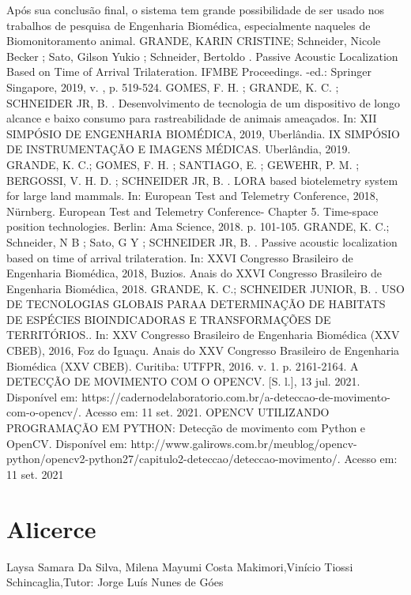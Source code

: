 Após sua conclusão final, o sistema tem grande possibilidade de ser usado nos trabalhos de
pesquisa de Engenharia Biomédica, especialmente naqueles de Biomonitoramento animal.
GRANDE, KARIN CRISTINE; Schneider, Nicole Becker ; Sato, Gilson Yukio ; Schneider, Bertoldo . Passive Acoustic Localization
Based on Time of Arrival Trilateration. IFMBE Proceedings. -ed.: Springer Singapore, 2019, v. , p. 519-524.
GOMES, F. H. ; GRANDE, K. C. ; SCHNEIDER JR, B. . Desenvolvimento de tecnologia de um dispositivo de longo alcance e baixo
consumo para rastreabilidade de animais ameaçados. In: XII SIMPÓSIO DE ENGENHARIA BIOMÉDICA, 2019, Uberlândia. IX
SIMPÓSIO DE INSTRUMENTAÇÃO E IMAGENS MÉDICAS. Uberlândia, 2019.
GRANDE, K. C.; GOMES, F. H. ; SANTIAGO, E. ; GEWEHR, P. M. ; BERGOSSI, V. H. D. ; SCHNEIDER JR, B. . LORA based
biotelemetry system for large land mammals. In: European Test and Telemetry Conference, 2018, Nürnberg. European Test and
Telemetry Conference- Chapter 5. Time-space position technologies. Berlin: Ama Science, 2018. p. 101-105.
GRANDE, K. C.; Schneider, N B ; Sato, G Y ; SCHNEIDER JR, B. . Passive acoustic localization based on time of arrival trilateration.
In: XXVI Congresso Brasileiro de Engenharia Biomédica, 2018, Buzios. Anais do XXVI Congresso Brasileiro de Engenharia
Biomédica, 2018.
GRANDE, K. C.; SCHNEIDER JUNIOR, B. . USO DE TECNOLOGIAS GLOBAIS PARAA DETERMINAÇÃO DE HABITATS DE
ESPÉCIES BIOINDICADORAS E TRANSFORMAÇÕES DE TERRITÓRIOS.. In: XXV Congresso Brasileiro de Engenharia
Biomédica (XXV CBEB), 2016, Foz do Iguaçu. Anais do XXV Congresso Brasileiro de Engenharia Biomédica (XXV CBEB). Curitiba:
UTFPR, 2016. v. 1. p. 2161-2164.
A DETECÇÃO DE MOVIMENTO COM O OPENCV. [S. l.], 13 jul. 2021. Disponível em:
https://cadernodelaboratorio.com.br/a-deteccao-de-movimento-com-o-opencv/. Acesso em: 11 set. 2021.
OPENCV UTILIZANDO PROGRAMAÇÃO EM PYTHON: Detecção de movimento com Python e OpenCV. Disponível em:
http://www.galirows.com.br/meublog/opencv-python/opencv2-python27/capitulo2-deteccao/deteccao-movimento/. Acesso em: 11 set.
2021




\section*{Alicerce}

Laysa Samara Da Silva, Milena Mayumi Costa Makimori,Vinício Tiossi  Schincaglia,Tutor: Jorge Luís Nunes de Góes


